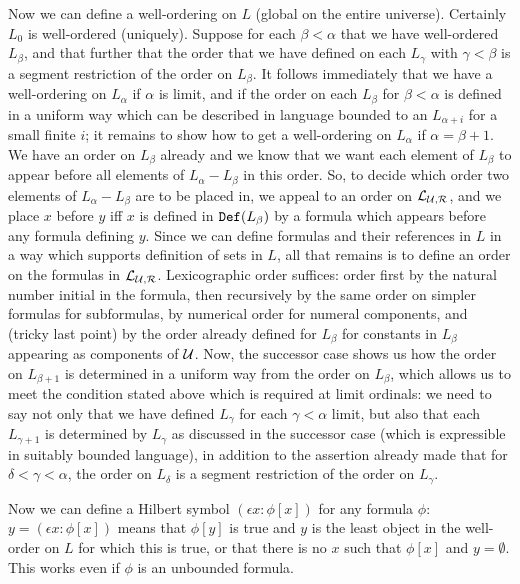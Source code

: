 \documentclass[12pt]{book}
\begin{document}
Now we can define a well-ordering on $L$ (global on the entire universe).  Certainly $L_0$ is well-ordered (uniquely).  Suppose for each $\beta<\alpha$
that we have well-ordered $L_{\beta}$, and that further that the order that we have defined on each $L_{\gamma}$ with $\gamma<\beta$ is a segment restriction
of the order on $L_{\beta}$.  It follows immediately that we have a well-ordering on $L_{\alpha}$ if $\alpha$ is limit, and if the order on each $L_{\beta}$ for $\beta<\alpha$ is defined in a uniform way which can be described in language bounded to an $L_{\alpha+i}$ for a small finite $i$;  it remains to show how to get
a well-ordering on $L_{\alpha}$ if $\alpha=\beta+1$.  We have an order on $L_{\beta}$ already and we know that we want each element of
$L_{\beta}$ to appear before all elements of $L_{\alpha} - L_{\beta}$ in this order.  So, to decide which order two elements of $L_{\alpha} - L_{\beta}$
are to be placed in, we appeal to an order on ${\cal L}_{\cal U,R}$, and we place $x$ before $y$ iff $x$ is defined in ${\tt Def}(L_{\beta})$ by a formula which appears before any formula defining $y$.  Since we can define formulas and their references in $L$ in a way which supports definition of sets in $L$, all that remains is to define an order on the formulas in ${\cal L}_{\cal U,R}$.  Lexicographic order suffices:  order first by the natural number initial in the formula, then recursively by the same order on simpler formulas for subformulas, by numerical order for numeral components,
and (tricky last point) by the order already defined for $L_{\beta}$ for constants in $L_{\beta}$ appearing as components of $\cal U$.  Now, the successor case shows us how the order
on $L_{\beta+1}$ is determined in a uniform way from the order on $L_{\beta}$, which allows us to meet the condition stated above which is required at limit ordinals:  we need to say not only that we have defined $L_{\gamma}$ for each $\gamma<\alpha$ limit, but also that each $L_{\gamma+1}$ is determined by $L_{\gamma}$ as discussed in the successor case (which is expressible in suitably bounded language), in addition to the assertion already made that for $\delta<\gamma<\alpha$, the order on $L_{\delta}$ is a segment restriction of the order on $L_{\gamma}$.


Now we can define a Hilbert symbol $(\epsilon x:\phi[x])$ for any formula $\phi$:  $y=(\epsilon x:\phi[x])$ means that $\phi[y]$ is true
and $y$ is the least object in the well-order on $L$ for which this is true, or that there is no $x$ such that $\phi[x]$ and $y= \emptyset$.  This works even if $\phi$ is an unbounded formula.
\end{document}
